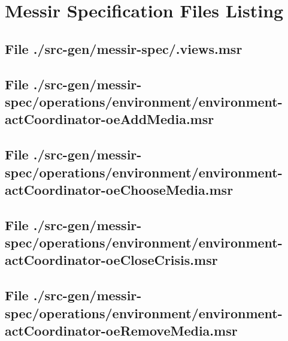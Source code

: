 \chapter{Messir Specification Files Listing}

\section[File /src-gen/messir-spec/.views.msr]{File ./src-gen/messir-spec/.views.msr}
\scriptsize

\normalsize
	
\section[File /src-gen/messir-spec.../environment-actCoordinator-oeAddMedia.msr]{File ./src-gen/messir-spec/operations/environment/environment-actCoordinator-oeAddMedia.msr}
\scriptsize

\normalsize
	
\section[File /src-gen/messir-spec.../environment-actCoordinator-oeChooseMedia.msr]{File ./src-gen/messir-spec/operations/environment/environment-actCoordinator-oeChooseMedia.msr}
\scriptsize

\normalsize
	
\section[File /src-gen/messir-spec.../environment-actCoordinator-oeCloseCrisis.msr]{File ./src-gen/messir-spec/operations/environment/environment-actCoordinator-oeCloseCrisis.msr}
\scriptsize

\normalsize
	
\section[File /src-gen/messir-spec.../environment-actCoordinator-oeRemoveMedia.msr]{File ./src-gen/messir-spec/operations/environment/environment-actCoordinator-oeRemoveMedia.msr}
\scriptsize

\normalsize
	
